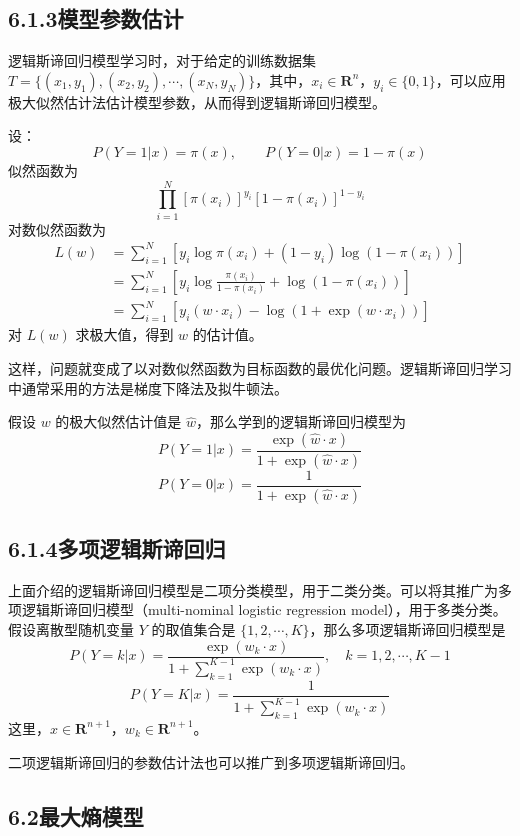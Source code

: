 \documentclass[UTF8, 12pt, fontset=fandol, oneside]{ctexart}
\begin{document}
\subsection*{6.1.3\quad 模型参数估计}

逻辑斯谛回归模型学习时，对于给定的训练数据集 $T=\{(x_1,y_1),(x_2,y_2),\cdots,(x_N,y_N)\}$，其中，$x_i\in\mathbf{R}^n$，$y_i\in\{0,1\}$，可以应用极大似然估计法估计模型参数，从而得到逻辑斯谛回归模型。

设：
\[
P(Y=1|x)=\pi(x),\qquad P(Y=0|x)=1-\pi(x)
\]
似然函数为
\[
\prod_{i=1}^N[\pi(x_i)]^{y_i}[1-\pi(x_i)]^{1-y_i}
\]
对数似然函数为
\[
\begin{aligned}
L(w)&=\sum_{i=1}^N[y_i\log\pi(x_i)+(1-y_i)\log(1-\pi(x_i))]\\
&=\sum_{i=1}^N\left[y_i\log\frac{\pi(x_i)}{1-\pi(x_i)}+\log(1-\pi(x_i))\right]\\
&=\sum_{i=1}^N[y_i(w\cdot x_i)-\log(1+\exp(w\cdot x_i))]
\end{aligned}
\]
对 $L(w)$ 求极大值，得到 $w$ 的估计值。

这样，问题就变成了以对数似然函数为目标函数的最优化问题。逻辑斯谛回归学习中通常采用的方法是梯度下降法及拟牛顿法。

假设 $w$ 的极大似然估计值是 $\hat{w}$，那么学到的逻辑斯谛回归模型为
\[
P(Y=1|x)=\frac{\exp(\hat{w}\cdot x)}{1+\exp(\hat{w}\cdot x)}
\]
\[
P(Y=0|x)=\frac{1}{1+\exp(\hat{w}\cdot x)}
\]

\subsection*{6.1.4\quad 多项逻辑斯谛回归}

上面介绍的逻辑斯谛回归模型是二项分类模型，用于二类分类。可以将其推广为多项逻辑斯谛回归模型（multi-nominal logistic regression model），用于多类分类。假设离散型随机变量 $Y$ 的取值集合是 $\{1,2,\cdots,K\}$，那么多项逻辑斯谛回归模型是
\begin{equation}
P(Y=k|x)=\frac{\exp(w_k\cdot x)}{1+\sum_{k=1}^{K-1}\exp(w_k\cdot x)},\quad k=1,2,\cdots,K-1
\tag{6.7}
\end{equation}
\begin{equation}
P(Y=K|x)=\frac{1}{1+\sum_{k=1}^{K-1}\exp(w_k\cdot x)}
\tag{6.8}
\end{equation}
这里，$x\in\mathbf{R}^{n+1}$，$w_k\in\mathbf{R}^{n+1}$。

二项逻辑斯谛回归的参数估计法也可以推广到多项逻辑斯谛回归。

\subsection*{6.2\quad 最大熵模型}
\end{document}
